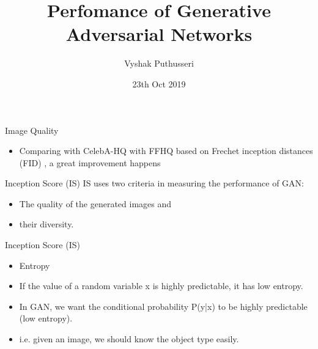 \documentclass[10pt]{beamer}
\title{Perfomance of  Generative Adversarial Networks}
\date{\regno}
\author{Vyshak Puthusseri}
\institute{TVE17MCA054 \\
\text{MCA CET }\\
S5 : 51
}
\date{23th Oct 2019}
\begin{document}
\maketitle





\begin{frame}[fragile]{Image Quality }
    
        \begin{itemize}
        \item Comparing with CelebA-HQ with FFHQ based on Frechet inception distances (FID) , a great improvement happens
    \end{itemize}

\end{frame}


\begin{frame}[fragile]{Inception Score (IS)}
IS uses two criteria in measuring the performance of GAN:
    \begin{itemize}
        \item The quality of the generated images and
        \item their diversity.
    \end{itemize}
\end{frame}

\begin{frame}[fragile]{Inception Score (IS)}
    \begin{itemize}
        \item Entropy
        \item If the value of a random variable x is highly predictable, it has low entropy.
        \item In GAN, we want the conditional probability P(y|x) to be highly predictable (low entropy).
        \item i.e. given an image, we should know the object type easily.
    \end{itemize}
\end{frame}
\end{document}
